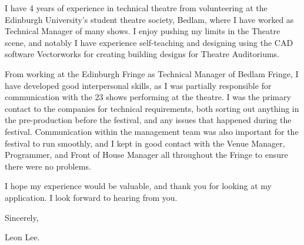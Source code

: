 \documentclass[10pt,english]{article}
\begin{document}
\medskip

I have 4 years of experience in technical theatre from volunteering at the Edinburgh University's student theatre society, Bedlam, where I have worked as Technical Manager of many shows. I enjoy pushing my limits in the Theatre scene, and notably I have experience self-teaching and designing using the CAD software Vectorworks for creating building designs for Theatre Auditoriums.

\medskip

From working at the Edinburgh Fringe as Technical Manager of Bedlam Fringe, I have developed good interpersonal skills, as I was partially responsible for communication with the 23 shows performing at the theatre. I was the primary contact to the companies for technical requirements, both sorting out anything in the pre-production before the festival, and any issues that happened during the festival. Communication within the management team was also important for the festival to run smoothly, and I kept in good contact with the Venue Manager, Programmer, and Front of House Manager all throughout the Fringe to ensure there were no problems.

\medskip

I hope my experience would be valuable, and thank you for looking at my application. I look forward to hearing from you.
\medskip

Sincerely,

Leon Lee.
\end{document}
